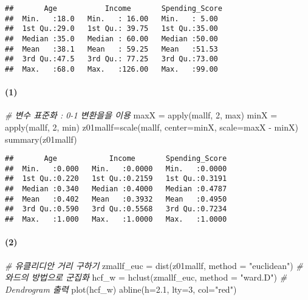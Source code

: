 \documentclass[
]{article}
\newenvironment{Shaded}{\begin{snugshade}}{\end{snugshade}}
\newcommand{\AttributeTok}[1]{\textcolor[rgb]{0.77,0.63,0.00}{#1}}
\newcommand{\CommentTok}[1]{\textcolor[rgb]{0.56,0.35,0.01}{\textit{#1}}}
\newcommand{\DecValTok}[1]{\textcolor[rgb]{0.00,0.00,0.81}{#1}}
\newcommand{\FloatTok}[1]{\textcolor[rgb]{0.00,0.00,0.81}{#1}}
\newcommand{\FunctionTok}[1]{\textcolor[rgb]{0.00,0.00,0.00}{#1}}
\newcommand{\NormalTok}[1]{#1}
\newcommand{\OtherTok}[1]{\textcolor[rgb]{0.56,0.35,0.01}{#1}}
\newcommand{\SpecialCharTok}[1]{\textcolor[rgb]{0.00,0.00,0.00}{#1}}
\newcommand{\StringTok}[1]{\textcolor[rgb]{0.31,0.60,0.02}{#1}}
\begin{document}
\begin{verbatim}
##       Age           Income       Spending_Score 
##  Min.   :18.0   Min.   : 16.00   Min.   : 5.00  
##  1st Qu.:29.0   1st Qu.: 39.75   1st Qu.:35.00  
##  Median :35.0   Median : 60.00   Median :50.00  
##  Mean   :38.1   Mean   : 59.25   Mean   :51.53  
##  3rd Qu.:47.5   3rd Qu.: 77.25   3rd Qu.:73.00  
##  Max.   :68.0   Max.   :126.00   Max.   :99.00
\end{verbatim}

\hypertarget{section-10}{%
\paragraph{(1)}\label{section-10}}

\begin{Shaded}
\begin{Highlighting}[]
\CommentTok{\# 변수 표준화 : 0{-}1 변환을을 이용}
\NormalTok{maxX }\OtherTok{=} \FunctionTok{apply}\NormalTok{(mallf, }\DecValTok{2}\NormalTok{, max)}
\NormalTok{minX }\OtherTok{=} \FunctionTok{apply}\NormalTok{(mallf, }\DecValTok{2}\NormalTok{, min)}
\NormalTok{z01mallf}\OtherTok{=}\FunctionTok{scale}\NormalTok{(mallf, }\AttributeTok{center=}\NormalTok{minX, }\AttributeTok{scale=}\NormalTok{maxX }\SpecialCharTok{{-}}\NormalTok{ minX)}
\FunctionTok{summary}\NormalTok{(z01mallf)}
\end{Highlighting}
\end{Shaded}

\begin{verbatim}
##       Age            Income       Spending_Score  
##  Min.   :0.000   Min.   :0.0000   Min.   :0.0000  
##  1st Qu.:0.220   1st Qu.:0.2159   1st Qu.:0.3191  
##  Median :0.340   Median :0.4000   Median :0.4787  
##  Mean   :0.402   Mean   :0.3932   Mean   :0.4950  
##  3rd Qu.:0.590   3rd Qu.:0.5568   3rd Qu.:0.7234  
##  Max.   :1.000   Max.   :1.0000   Max.   :1.0000
\end{verbatim}

\hypertarget{section-11}{%
\paragraph{(2)}\label{section-11}}

\begin{Shaded}
\begin{Highlighting}[]
\CommentTok{\# 유클리디안 거리 구하기}
\NormalTok{zmallf\_euc }\OtherTok{=} \FunctionTok{dist}\NormalTok{(z01mallf, }\AttributeTok{method =} \StringTok{"euclidean"}\NormalTok{)}
\CommentTok{\# 와드의 방법으로 군집화}
\NormalTok{hcf\_w }\OtherTok{=} \FunctionTok{hclust}\NormalTok{(zmallf\_euc, }\AttributeTok{method =} \StringTok{"ward.D"}\NormalTok{)}
\CommentTok{\# Dendrogram 출력}
\FunctionTok{plot}\NormalTok{(hcf\_w)}
\FunctionTok{abline}\NormalTok{(}\AttributeTok{h=}\FloatTok{2.1}\NormalTok{, }\AttributeTok{lty=}\DecValTok{3}\NormalTok{, }\AttributeTok{col=}\StringTok{"red"}\NormalTok{)}
\end{Highlighting}
\end{Shaded}
\end{document}
